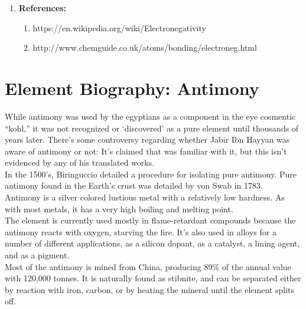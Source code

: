 \documentclass[11pt,letterpaper]{report}
\begin{document}
\begin{enumerate}
  \item \textbf{References:} \\
    \begin{enumerate}
      \item https://en.wikipedia.org/wiki/Electronegativity \\
      \item http://www.chemguide.co.uk/atoms/bonding/electroneg.html \\
    \end{enumerate}
\end{enumerate}

\section*{Element Biography: Antimony}

While antimony was used by the egyptians as a component in the eye cosmentic ``kohl,'' it was not recognized or `discovered' as a pure element until thousands of years later. There's some controversy regarding whether Jabir Ibn Hayyan was aware of antimony or not: It's claimed that was familiar with it, but this isn't evidenced by any of his translated works. \\

In the 1500's, Biringuccio detailed a procedure for isolating pure antimony. Pure antimony found in the Earth's crust was detailed by von Swab in 1783. \\

Antimony is a silver colored lustious metal with a relatively low hardness. As with most metals, it has a very high boiling and melting point.\\

The element is currently used mostly in flame-retardant compounds because the antimony reacts with oxygen, starving the fire. It's also used in alloys for a number of different applications, as a silicon dopant, as a catalyst, a lining agent, and as a pigment. \\

Most of the antimony is mined from China, producing 89\% of the annual value with 120,000 tonnes. It is naturally found as stibnite, and can be separated either by reaction with iron, carbon, or by heating the mineral until the element splits off. 
\end{document}
